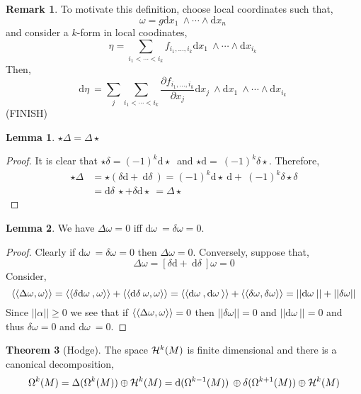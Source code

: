\documentclass[12pt]{extarticle}
\renewcommand{\d}[1]{ \mathrm{d}#1 \:}
\newcommand{\pderiv}[2]{\frac{\partial{#1}}{\partial{#2}}}
\theoremstyle{definition}
\newtheorem{theorem}{Theorem}[section]
\newtheorem{lemma}[theorem]{Lemma}
\newtheorem{remark}{Remark}
\begin{document}
\begin{remark}
To motivate this definition, choose local coordinates such that,
\[ \omega = g \d{x_1} \wedge \cdots \wedge \d{x_n} \] 
and consider a $k$-form in local coodinates,
\[ \eta = \sum_{i_1 < \cdots < i_k} f_{i_1, \dots, i_k} \d{x_1} \wedge \cdots \wedge \d{x_{i_k}} \]
Then,
\[ \d{\eta} = \sum_j \sum_{i_1 < \cdots < i_k} \pderiv{f_{i_1, \dots, i_k}}{x_j} \d{x_j} \wedge \d{x_1} \wedge \cdots \wedge \d{x_{i_k}} \]
(FINISH)
\end{remark}

\begin{lemma}
$\star \Delta = \Delta \star$
\end{lemma}

\begin{proof}
It is clear that $\star \delta = (-1)^k \d \star$ and $\star \d = (-1)^k \delta \star$. Therefore,
\begin{align*}
\star \Delta & = \star (\delta \d + \d \delta ) = (-1)^k \d \star \d + (-1)^k \delta \star \delta 
\\
& = \d  \delta \star + \delta \d \star = \Delta \star 
\end{align*} 
\end{proof}

\begin{lemma}
We have $\Delta \omega = 0$ iff $\d{\omega} = \delta{\omega} = 0$.
\end{lemma}

\begin{proof}
Clearly if $\d{\omega} = \delta{\omega} = 0$ then $\Delta \omega = 0$. Conversely, suppose that,
\[ \Delta \omega = [\delta \d + \d \delta ] \omega = 0 \]
Consider,
\[ \Inner{\Delta \omega}{\omega} = \Inner{\delta \d{\omega}}{\omega} + \Inner{\d \delta \omega}{\omega}  = \Inner{\d{\omega}}{\d{\omega}} + \Inner{\delta \omega}{\delta \omega} = ||\d{\omega} || + ||\delta \omega||  \]
Since $|| \alpha || \ge 0$ we see that if $\left< \left< \Delta \omega, \omega \right> \right> = 0$ then $|| \delta \omega || = 0$ and $|| \d{\omega} || = 0$ and thus $\delta \omega = 0$ and $\d{\omega} = 0$.
\end{proof}

\begin{theorem}[Hodge]
The space $\mathcal{H}^k(M)$ is finite dimensional and there is a canonical decomposition,
\[ \Omega^k(M) = \Delta(\Omega^k(M)) \oplus \Har^k(M) = \d{(\Omega^{k-1}(M))} \oplus \delta(\Omega^{k+1}(M)) \oplus \Har^k(M) \]
\end{theorem}
\end{document}
